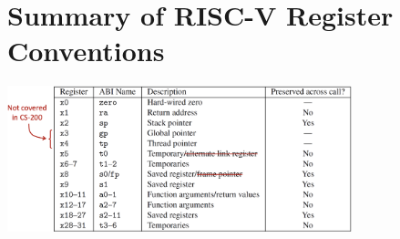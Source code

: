 \section{Summary of RISC-V Register Conventions}
\begin{center}
    \includegraphics[width=0.75\textwidth]{chapters/chapter1b/images/summary.png}
\end{center}